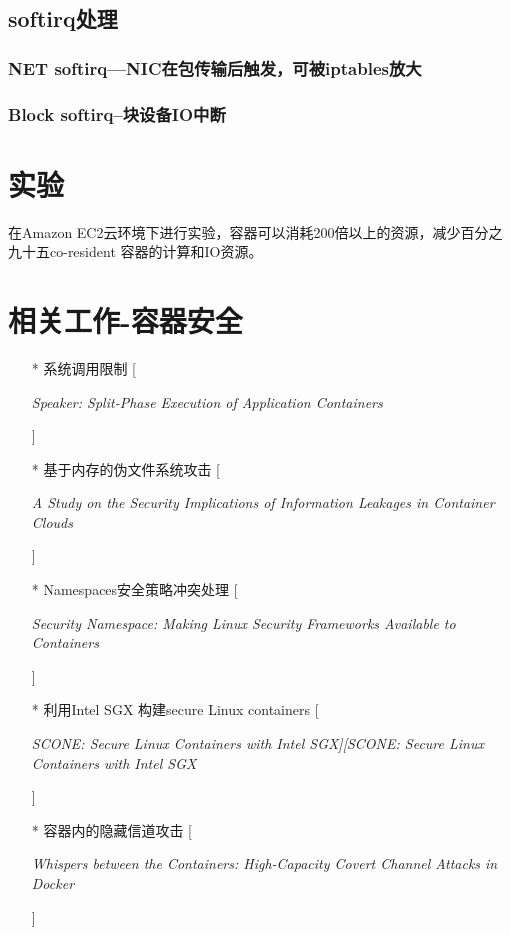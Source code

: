 \documentclass[UTF8]{ctexart}
\begin{document}
	\subsection{softirq处理}
	\subsubsection{NET softirq—NIC在包传输后触发，可被iptables放大}
	\subsubsection{Block softirq--块设备IO中断}
	\clearpage
	\section{实验}\label{sec:diwujie}
	在Amazon EC2云环境下进行实验，容器可以消耗200倍以上的资源，减少百分之九十五co-resident 容器的计算和IO资源。
	\clearpage

	\section{相关工作-容器安全}\label{sec:diliujie}
	\begin{itemize}
	\item[*] 系统调用限制 [\begin{upshape} \itshape Speaker: Split-Phase Execution of Application Containers\end{upshape}]
	\item[*] 基于内存的伪文件系统攻击 [\begin{upshape} \itshape A Study on the Security Implications of Information Leakages in Container Clouds \end{upshape}]
	\item[*] Namespaces安全策略冲突处理 [\begin{upshape} \itshape Security Namespace: Making Linux Security Frameworks Available to Containers\end{upshape}]
	\item[*] 利用Intel SGX 构建secure Linux containers  [\begin{upshape} \itshape SCONE: Secure Linux Containers with Intel SGX][SCONE: Secure Linux Containers with Intel SGX \end{upshape}]
	\item[*] 容器内的隐藏信道攻击  [\begin{upshape} \itshape Whispers between the Containers: High-Capacity Covert Channel Attacks in Docker \end{upshape}]
	\end{itemize}
	\clearpage
	
\end{document}
